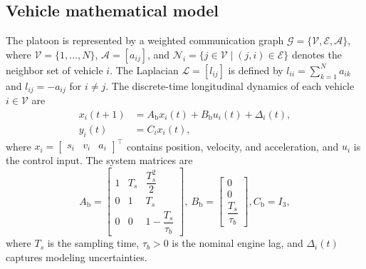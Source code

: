 \documentclass{ifacconf}
\def\V{\mathcal{V}} %
\def\E{\mathcal{E}} %
\def\G{\mathcal{G}} %
\def\A{\mathcal{A}} %
\def\L{\mathcal{L}} %
\def\N{\mathcal{N}} %
\begin{document}
\subsection{Vehicle mathematical model}\label{sec_vehiclemodel}
\vspace*{-0.3cm}
The platoon is represented by a weighted communication graph $\G=\{\V,\E,\A\}$, where $\V=\{1,\ldots,N\}$, $\A=[a_{ij}]$, and $\N_i=\{j\in\V\mid(j,i)\in\E\}$ denotes the neighbor set of vehicle $i$. The Laplacian $\L=[l_{ij}]$ is defined by $l_{ii}=\sum_{k=1}^{N}a_{ik}$ and $l_{ij}=-a_{ij}$ for $i\neq j$.
The discrete-time longitudinal dynamics of each vehicle $i \in \V$ are
\begin{equation}\label{v_i}
    \begin{aligned}
        x_i(t+1) &= A_{\text{b}} x_i(t) + B_{\text{b}}u_{i}(t) + \Delta_i(t),\\
        y_i(t) &= C_{i} x_i(t),
    \end{aligned} 
\end{equation}
where $x_i=\begin{bmatrix} s_i & v_i & a_i \end{bmatrix}^{\top}$ contains position, velocity, and acceleration, and $u_i$ is the control input. The system matrices are
\begin{equation*}
    A_{\text{b}}  =\begin{bmatrix}
    1 & T_s & \dfrac{T^2_s}{2} \\
    0 & 1 & T_s \\
    0 &  0 & 1 - \dfrac{T_s}{\tau_b}
        \end{bmatrix}, \
    B_{\text{b}} =\begin{bmatrix}
    0 \\
    0 \\
    \dfrac{T_s}{\tau_b}
        \end{bmatrix}, 
    C_{\text{b}} = I_{3}, 
\end{equation*}
where $T_s$ is the sampling time, $\tau_b>0$ is the nominal engine lag, and $\Delta_i(t)$ captures modeling uncertainties. 
\end{document}
